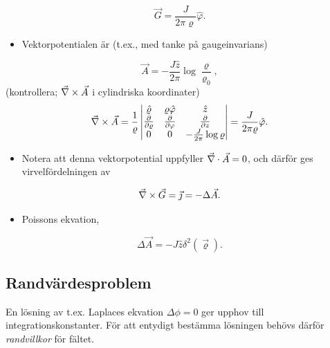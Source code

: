 \documentclass[%
oneside,                 %
final,                   %
10pt]{article}
\begin{document}
\noindent
$$
\vec G=\frac{J}{2\pi\varrho}\hat\varphi.
$$
\begin{itemize}
\item Vektorpotentialen är (t.ex., med tanke på gaugeinvarians)
\end{itemize}

\noindent
$$
\vec A=-\frac{J\hat z}{2\pi}\log\frac{\varrho}{\varrho_0},
$$
(kontrollera; $\vec{\nabla}\times\vec A$ i cylindriska koordinater)
$$
\vec{\nabla}\times\vec A=\frac{1}{\varrho}
	\begin{vmatrix}
        \hat\varrho & \varrho\hat\varphi & \hat z \\ \frac{\partial}{\partial \varrho} & 
\frac{\partial}{\partial \varphi} &
        \frac{\partial}{\partial z} \\ 0\mbox{} & 0\mbox{} & -\frac{J}{2\pi}\log\varrho \\
        \end{vmatrix}
           =\frac{J}{2\pi\varrho}\hat\varphi.
$$
\begin{itemize}
\item Notera att denna vektorpotential uppfyller $\vec{\nabla}\cdot\vec A=0$, och därför ges virvelfördelningen av 
\end{itemize}

\noindent
$$
\vec{\nabla} \times \vec{G} = \vec{\jmath} = -\Delta\vec A.
$$ 
\begin{itemize}
\item Poissons ekvation, 
\end{itemize}

\noindent
$$
\Delta\vec A=-J\hat z\delta^2(\vec{\varrho}).
$$


\subsection*{Randvärdesproblem}

En lösning av t.ex. Laplaces ekvation $\Delta \phi = 0$ ger upphov till integrationskonstanter. För att entydigt bestämma lösningen behövs därför \emph{randvillkor} för fältet.
\end{document}
